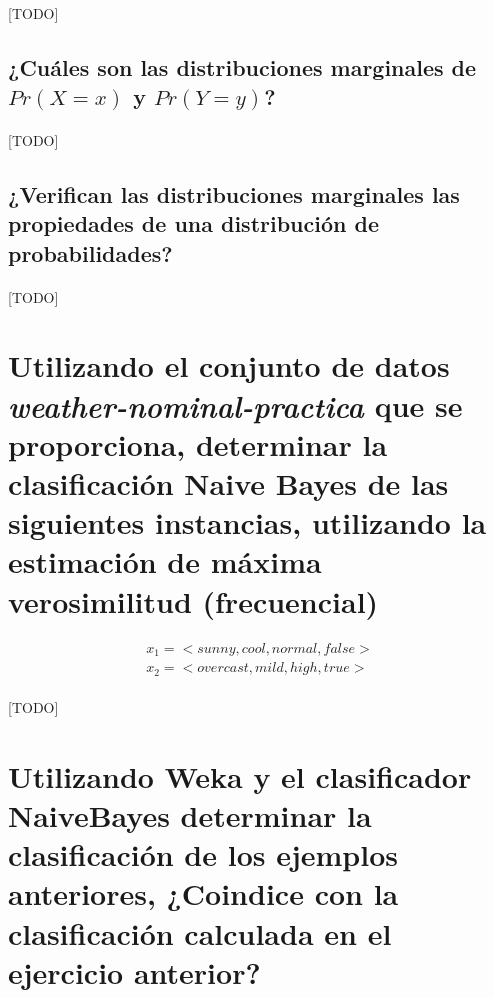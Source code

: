 \documentclass{article}
\begin{document}
			\paragraph{}
			[TODO]

		\subsection{¿Cuáles son las distribuciones marginales de $Pr(X = x)$ y $Pr(Y = y)$?}

			\paragraph{}
			[TODO]

		\subsection{¿Verifican las distribuciones marginales las propiedades de una distribución de probabilidades?}

			\paragraph{}
			[TODO]

	\section{Utilizando el conjunto de datos \emph{weather-nominal-practica} que se proporciona, determinar la clasificación Naive Bayes de las siguientes instancias, utilizando la estimación de máxima verosimilitud (frecuencial)}
	\label{sec:e3}

		\begin{align}
			x_1 = <sunny, cool, normal, false> \\
			x_2 = <overcast, mild, high, true>
		\end{align}

		\paragraph{}
		[TODO]

	\section{Utilizando Weka y el clasificador NaiveBayes determinar la clasificación de los ejemplos anteriores, ¿Coindice con la clasificación calculada en el ejercicio anterior?}
	\label{sec:e4}
\end{document}
